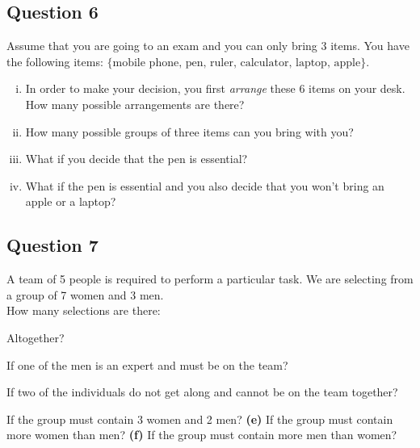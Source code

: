 

\subsection*{Question 6}
Assume that you are going to an exam and you can only bring 3 items. You have the following items: $\{\text{mobile phone, } \text{pen, } \text{ruler, } \text{calculator, } \text{laptop, } \text{apple} \}$.\\[-0.2cm]

\begin{enumerate}[(i)]
\item In order to make your decision, you first \emph{arrange} these 6 items on your desk. How many possible arrangements are there? \item How many possible groups of three items can you bring with you? \item What if you decide that the pen is essential? \item What if the pen is essential and you also decide that you won't bring an apple or a laptop?
\end{enumerate}


\subsection*{Question 7}
A team of 5 people is required to perform a particular task. We are selecting from a group of 7 women and 3 men.\\[0.2cm]
How many selections are there:\\[-0.2cm]

\item  Altogether? 
 \item  If one of the men is an expert and must be on the team? 
 \item  If two of the individuals do not get along and cannot be on the team together? 
 \item  If the group must contain 3 women and 2 men? {\bf(e)} If the group must contain more women than men? 
 {\bf(f)} If the group must contain more men than women?
